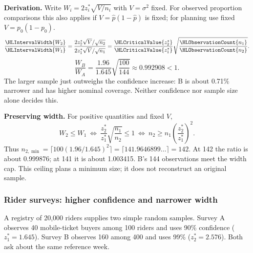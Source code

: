 \textbf{Derivation.} Write $W_i=2z_i^*\sqrt{V/n_i}$ with $V=\sigma^2$ fixed. For observed proportion comparisons this also applies if $V=\hat p(1-\hat p)$ is fixed; for planning use fixed $V=p_0(1-p_0)$.
\[\frac{\HLIntervalWidth{W_2}}{\HLIntervalWidth{W_1}}
=\frac{2z_2^*\sqrt V/\sqrt{n_2}}{2z_1^*\sqrt V/\sqrt{n_1}}
=\frac{\HLCriticalValue{z_2^*}}{\HLCriticalValue{z_1^*}}\sqrt{\frac{\HLObservationCount{n_1}}{\HLObservationCount{n_2}}}.\]
\[\frac{W_B}{W_A}=\frac{1.96}{1.645}\sqrt{\frac{100}{144}}\approx0.992908<1.\]
The larger sample just outweighs the confidence increase: B is about 0.71\% narrower and has higher nominal coverage. Neither confidence nor sample size alone decides this.

\textbf{Preserving width.} For positive quantities and fixed $V$,
\[W_2\le W_1\ \Longleftrightarrow\ \frac{z_2^*}{z_1^*}\sqrt{\frac{n_1}{n_2}}\le1
\ \Longleftrightarrow\ n_2\ge n_1\left(\frac{z_2^*}{z_1^*}\right)^2.\]
Thus $n_{2,\min}=\lceil100(1.96/1.645)^2\rceil=\lceil141.9646899\ldots\rceil=142$. At 142 the ratio is about 0.999876; at 141 it is about 1.003415. B's 144 observations meet the width cap. This ceiling plans a minimum size; it does not reconstruct an original sample.
\clearpage
\subsubsection{Rider surveys: higher confidence and narrower width}\label{prob:c7-prop-both}
A registry of 20,000 riders supplies two simple random samples. Survey A observes 40 mobile-ticket buyers among 100 riders and uses 90\% confidence ($z_1^*=1.645$). Survey B observes 160 among 400 and uses 99\% ($z_2^*=2.576$). Both ask about the same reference week.
